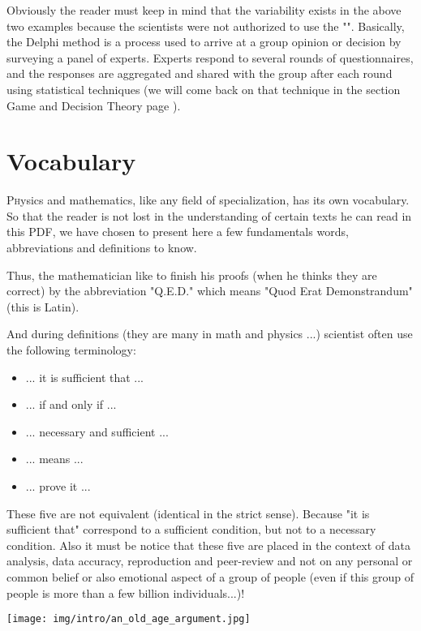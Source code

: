 	Obviously the reader must keep in mind that the variability exists in the above two examples because the scientists were not authorized to use the "". Basically, the Delphi method is a process used to arrive at a group opinion or decision by surveying a panel of experts. Experts respond to several rounds of questionnaires, and the responses are aggregated and shared with the group after each round using statistical techniques (we will come back on that technique in the section Game and Decision Theory page \pageref{Delphi method}).

	\newpage
	\thispagestyle{empty}
	\mbox{}
	\section{Vocabulary}
	\lettrine[lines=4]{\color{BrickRed}P}hysics and mathematics, like any field of specialization, has its own vocabulary. So that the reader is not lost in the understanding of certain texts he can read in this PDF, we have chosen to present here a few fundamentals words, abbreviations and definitions to know.
	
	Thus, the mathematician like to finish his proofs (when he thinks they are correct) by the abbreviation "Q.E.D." which means "Quod Erat Demonstrandum" (this is Latin).
	
	And during definitions (they are many in math and physics ...) scientist often use the following terminology:
	
	\begin{itemize}
	\item ... it is sufficient that ...
	
	\item ... if and only if ...
	
	\item ... necessary and sufficient ...
	
	\item ... means ...
	
	\item ... prove it ...
	\end{itemize}
	These five are not equivalent (identical in the strict sense). Because "it is sufficient that" correspond to a sufficient condition, but not to a necessary condition. Also it must be notice that these five are placed in the context of data analysis, data accuracy, reproduction and peer-review and not on any personal or common belief or also emotional aspect of a group of people (even if this group of people is more than a few billion individuals...)!
	\begin{center}
		\texttt{[image: img/intro/an\_old\_age\_argument.jpg]}
	\end{center}

